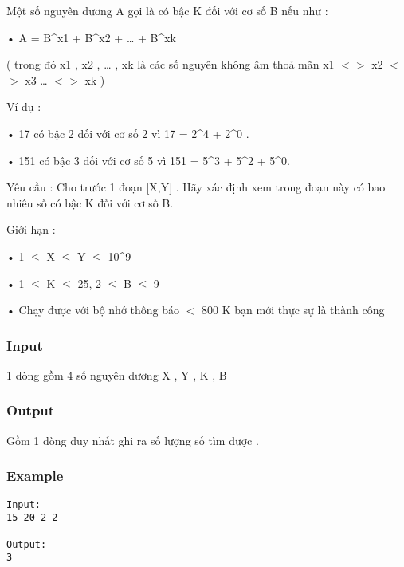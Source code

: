 



   Một số nguyên dương A gọi là có bậc K đối với cơ số B nếu như :   


   • A = B^x1 + B^x2 + … + B^xk   


   ( trong đó x1 , x2 , … , xk là các số nguyên không âm thoả mãn x1 $<$$>$ x2 $<$$>$ x3 … $<$$>$ xk )   


   Ví dụ :   


   • 17 có bậc 2 đối với cơ số 2 vì 17 = 2^4 + 2^0 .   


   • 151 có bậc 3 đối với cơ số 5 vì 151 = 5^3 + 5^2 + 5^0.   


   Yêu cầu : Cho trước 1 đoạn [X,Y] . Hãy xác định xem trong đoạn này có bao nhiêu số có bậc K đối với cơ số B.   


   Giới hạn :   


   • 1  $\le$  X  $\le$  Y  $\le$  10^9   


   • 1  $\le$  K  $\le$  25, 2  $\le$  B  $\le$  9   


   • Chạy được với bộ nhớ thông báo $<$ 800 K bạn mới thực sự là thành công   




\subsubsection{   Input  }

   1 dòng gồm 4 số nguyên dương X , Y , K , B  

\subsubsection{   Output  }

   Gồm 1 dòng duy nhất ghi ra số lượng số tìm được .  

\subsubsection{   Example  }
\begin{verbatim}
Input:
15 20 2 2

Output:
3 
\end{verbatim}
